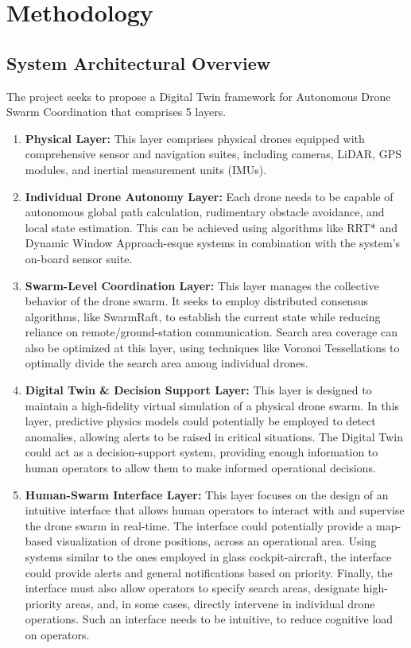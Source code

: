 \section{Methodology}\label{sec:methodology}

\subsection{System Architectural Overview}\label{subsec:system-architectural-overview}
The project seeks to propose a Digital Twin framework for Autonomous Drone Swarm Coordination that comprises 5 layers.

\begin{enumerate}
    \item \textbf{Physical Layer:} This layer comprises physical drones equipped with comprehensive sensor and navigation suites, including cameras, LiDAR, GPS modules, and inertial measurement units (IMUs).

    \item \textbf{Individual Drone Autonomy Layer:} Each drone needs to be capable of autonomous global path calculation, rudimentary obstacle avoidance, and local state estimation.
    This can be achieved using algorithms like RRT* and Dynamic Window Approach-esque systems in combination with the system's on-board sensor suite.

    \item \textbf{Swarm-Level Coordination Layer:} This layer manages the collective behavior of the drone swarm.
    It seeks to employ distributed consensus algorithms, like SwarmRaft, to establish the current state while reducing reliance on remote/ground-station communication.
    Search area coverage can also be optimized at this layer, using techniques like Voronoi Tessellations to optimally divide the search area among individual drones.

    \item \textbf{Digital Twin \& Decision Support Layer:} This layer is designed to maintain a high-fidelity virtual simulation of a physical drone swarm.
    In this layer, predictive physics models could potentially be employed to detect anomalies, allowing alerts to be raised in critical situations.
    The Digital Twin could act as a decision-support system, providing enough information to human operators to allow them to make informed operational decisions.

    \item \textbf{Human-Swarm Interface Layer:} This layer focuses on the design of an intuitive interface that allows human operators to interact with and supervise the drone swarm in real-time.
    The interface could potentially provide a map-based visualization of drone positions, across an operational area.
    Using systems similar to the ones employed in glass cockpit-aircraft, the interface could provide alerts and general notifications based on priority.
    Finally, the interface must also allow operators to specify search areas, designate high-priority areas, and, in some cases, directly intervene in individual drone operations.
    Such an interface needs to be intuitive, to reduce cognitive load on operators.
\end{enumerate}

